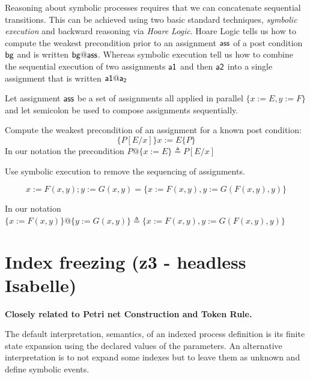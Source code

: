 \documentclass[]{article}
\begin{document}
Reasoning about symbolic processes requires that we can concatenate sequential transitions. This can be achieved using  two basic standard techniques, \emph{symbolic execution} and backward reasoning via \emph{Hoare Logic}. Hoare Logic tells us how to compute the weakest precondition prior to an assignment ${\sf ass}$ of  a post condition ${\sf bg}$ and is written  ${\sf bg@ass}$.  Whereas symbolic execution tell us how to combine the sequential execution of two assignments ${\sf a1}$ and then ${\sf a2}$ into a single assignment that is written ${\sf a1@a_2}$

Let assignment ${\sf ass}$ be a set of assignments all applied in parallel $\{x:=E,y:=F\}$ and let semicolon be used to compose assignments sequentially.

Compute the weakest precondition of an assignment for a known post condition:
\[ \{P[E/x]\} x:=E \{P\} \]
In our notation the precondition  $P@\{x:=E\}\triangleq P[E/x]$

Use symbolic execution to remove the sequencing of assignments.

\[ x:=F(x,y); y:=G(x,y)  = \{x:=F(x,y), y:=G(F(x,y),y)\}\]

In our notation $  \{x:=F(x,y)\}@\{y:=G(x,y)\}  \triangleq  \{x:=F(x,y), y:=G(F(x,y),y)\}$


\section{ Index freezing   (z3  -  headless Isabelle)}

{\bf Closely related to Petri net Construction and Token Rule.}

The default interpretation, semantics, of an indexed process definition is its finite state expansion using the declared values of the parameters. An alternative interpretation is to not expand some indexes but to leave them as unknown and define symbolic events.
\end{document}
